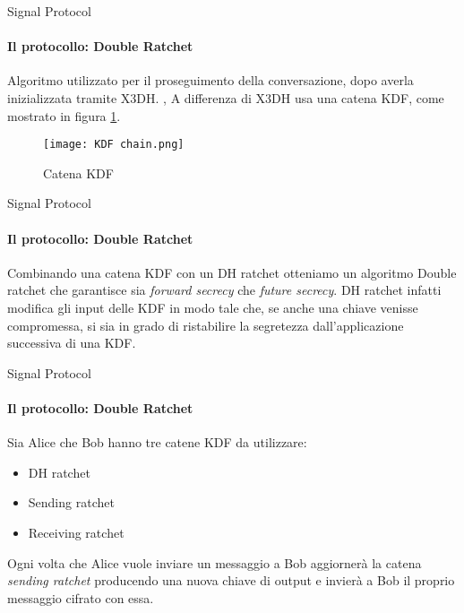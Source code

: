\begin{frame}{Signal Protocol}
    \framesubtitle{Il protocollo: Double Ratchet}

    Algoritmo utilizzato per il proseguimento della conversazione, dopo averla inizializzata tramite X3DH.\newline\pause
    \cite{doubleratchet}, \cite{VanDam} \newline   
    A differenza di X3DH usa una catena KDF, come mostrato in figura \ref{tag: KDF chain}.

    \begin{figure}
        \texttt{[image: KDF chain.png]}
        \caption{Catena KDF}
        \label{tag: KDF chain}
    \end{figure}

\end{frame}

\begin{frame}{Signal Protocol}
    \framesubtitle{Il protocollo: Double Ratchet}
    Combinando una catena KDF con un DH ratchet otteniamo un algoritmo Double ratchet che garantisce sia \textit{forward secrecy} che \textit{future secrecy}. \newline\pause
    DH ratchet infatti modifica gli input delle KDF in modo tale che, se anche una chiave venisse compromessa, si sia in grado di ristabilire la segretezza dall'applicazione successiva di una KDF.\newline
\end{frame}

\begin{frame}{Signal Protocol}
    \framesubtitle{Il protocollo: Double Ratchet}
    Sia Alice che Bob hanno tre catene KDF da utilizzare:
    \begin{itemize}
        \item DH ratchet
        \item Sending ratchet
        \item Receiving ratchet
    \end{itemize}\pause
    Ogni volta che Alice vuole inviare un messaggio a Bob aggiornerà la catena \textit{sending ratchet} producendo una nuova chiave di output e invierà a Bob il proprio messaggio cifrato con essa.
\end{frame}

